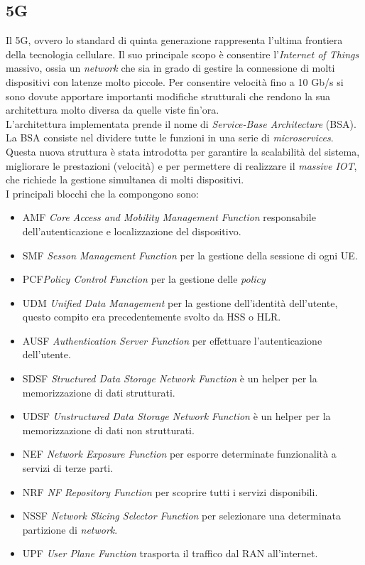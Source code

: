\clearpage

\subsection{5G}
Il 5G, ovvero lo standard di quinta generazione rappresenta l'ultima frontiera della tecnologia cellulare.
Il suo principale scopo è consentire l'\textit{Internet of Things} massivo, ossia un \textit{network} che sia 
in grado di gestire la connessione di molti dispositivi con latenze molto piccole.
Per consentire velocità fino a 10 Gb/s si sono
dovute apportare importanti modifiche strutturali che rendono la sua architettura molto diversa da quelle viste fin'ora.\\
L'architettura implementata prende il nome di \textit{Service-Base Architecture} (BSA).
La BSA consiste nel dividere tutte le funzioni in una serie di \textit{microservices}\cite{5g-approach}. 
Questa nuova struttura è stata introdotta per garantire la scalabilità del sistema, migliorare le prestazioni (velocità) e per 
permettere di realizzare il \textit{massive IOT}, che richiede la gestione simultanea di molti dispositivi.\\
I principali blocchi che la compongono sono:
\begin{itemize}
    \item AMF \textit{Core Access and Mobility Management Function} responsabile dell'autenticazione e localizzazione del dispositivo.
    \item SMF \textit{Sesson Management Function} per la gestione della sessione di ogni UE.
    \item PCF\textit{Policy Control Function} per la gestione delle \textit{policy}
    \item UDM \textit{Unified Data Management} per la gestione dell'identità dell'utente, questo compito era precedentemente svolto da HSS o HLR.
    \item AUSF \textit{Authentication Server Function} per effettuare l'autenticazione dell'utente.
    \item SDSF \textit{Structured Data Storage Network Function} è un helper per la memorizzazione di dati strutturati.
    \item UDSF \textit{Unstructured Data Storage Network Function} è un helper per la memorizzazione di dati non strutturati.
    \item NEF \textit{Network Exposure Function} per esporre determinate funzionalità a servizi di terze parti.
    \item NRF \textit{NF Repository Function} per scoprire tutti i servizi disponibili.
    \item NSSF \textit{Network Slicing Selector Function} per selezionare una determinata partizione di \textit{network}.
    \item UPF \textit{User Plane Function} trasporta il traffico dal RAN all'internet.
\end{itemize}
